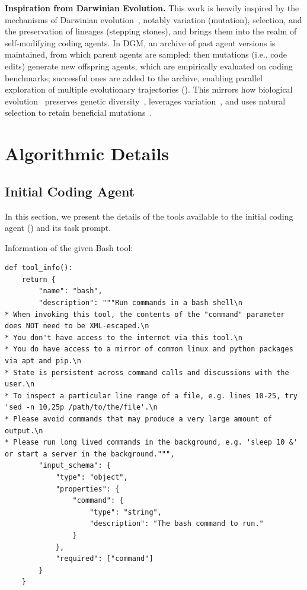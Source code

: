 \documentclass{article}
\begin{document}
\textbf{Inspiration from Darwinian Evolution.}
This work is heavily inspired by the mechanisms of Darwinian evolution~\citep{darwin2023origin}, notably variation (mutation), selection, and the preservation of lineages (stepping stones), and brings them into the realm of self-modifying coding agents. In DGM, an archive of past agent versions is maintained, from which parent agents are sampled; then mutations (i.e., code edits) generate new offspring agents, which are empirically evaluated on coding benchmarks; successful ones are added to the archive, enabling parallel exploration of multiple evolutionary trajectories (). This mirrors how biological evolution~\citep{edwards2000genetical, wright1932roles} preserves genetic diversity~\citep{mayr1982growth}, leverages variation~\citep{kimura1979neutral}, and uses natural selection to retain beneficial mutations~\citep{dobzhansky1970genetics}.

\section{Algorithmic Details}

\subsection{Initial Coding Agent}
\label{app:initial-agent}

In this section, we present the details of the tools available to the initial coding agent () and its task prompt.

Information of the given Bash tool:

\begin{lstlisting}
def tool_info():
    return {
        "name": "bash",
        "description": """Run commands in a bash shell\n
* When invoking this tool, the contents of the "command" parameter does NOT need to be XML-escaped.\n
* You don't have access to the internet via this tool.\n
* You do have access to a mirror of common linux and python packages via apt and pip.\n
* State is persistent across command calls and discussions with the user.\n
* To inspect a particular line range of a file, e.g. lines 10-25, try 'sed -n 10,25p /path/to/the/file'.\n
* Please avoid commands that may produce a very large amount of output.\n
* Please run long lived commands in the background, e.g. 'sleep 10 &' or start a server in the background.""",
        "input_schema": {
            "type": "object",
            "properties": {
                "command": {
                    "type": "string",
                    "description": "The bash command to run."
                }
            },
            "required": ["command"]
        }
    }
\end{lstlisting}
\end{document}
